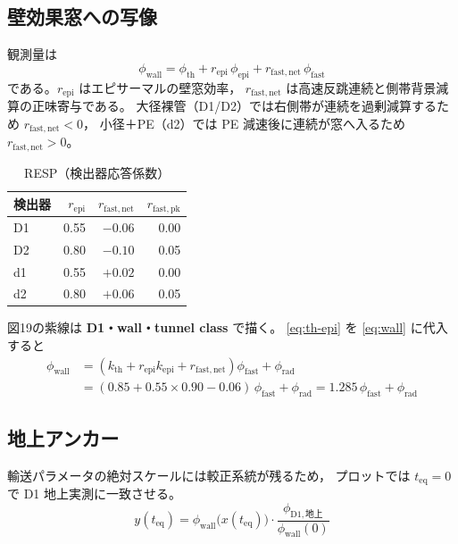 \documentclass[a4paper,11pt]{ltjsarticle}
\begin{document}
\subsection{壁効果窓への写像}

観測量は\cite{S3}
\begin{equation}
  \phi_{\mathrm{wall}}
  = \phi_{\mathrm{th}}
    + r_{\mathrm{epi}}\,\phi_{\mathrm{epi}}
    + r_{\mathrm{fast,net}}\,\phi_{\mathrm{fast}}
  \label{eq:wall}
\end{equation}
である。$r_{\mathrm{epi}}$ はエピサーマルの壁窓効率，
$r_{\mathrm{fast,net}}$ は高速反跳連続と側帯背景減算の正味寄与である。
大径裸管（D1/D2）では右側帯が連続を過剰減算するため $r_{\mathrm{fast,net}}<0$，
小径＋PE（d2）では PE 減速後に連続が窓へ入るため $r_{\mathrm{fast,net}}>0$\cite{Knoll,S3}。

\begin{table}[htbp]
  \centering
  \caption{RESP（検出器応答係数）\cite{S3}}
  \begin{tabular}{lrrr}
    \toprule
    検出器 & $r_{\mathrm{epi}}$ & $r_{\mathrm{fast,net}}$ & $r_{\mathrm{fast,pk}}$ \\
    \midrule
    D1 & 0.55 & $-0.06$ & 0.00 \\
    D2 & 0.80 & $-0.10$ & 0.05 \\
    d1 & 0.55 & $+0.02$ & 0.00 \\
    d2 & 0.80 & $+0.06$ & 0.05 \\
    \bottomrule
  \end{tabular}
\end{table}

図19の紫線は \textbf{D1・wall・tunnel class} で描く。
\eqref{eq:th-epi} を \eqref{eq:wall} に代入すると
\begin{align}
  \phi_{\mathrm{wall}}
  &= (k_{\mathrm{th}} + r_{\mathrm{epi}} k_{\mathrm{epi}} + r_{\mathrm{fast,net}})
     \phi_{\mathrm{fast}}
     + \phi_{\mathrm{rad}} \nonumber\\
  &= (0.85 + 0.55\times0.90 - 0.06)\,\phi_{\mathrm{fast}} + \phi_{\mathrm{rad}}
   = 1.285\,\phi_{\mathrm{fast}} + \phi_{\mathrm{rad}}
  \label{eq:wall-closed}
\end{align}

\subsection{地上アンカー}

輸送パラメータの絶対スケールには較正系統が残るため，
プロットでは $t_{\mathrm{eq}}=0$ で D1 地上実測に一致させる\cite{plotfig}。
\begin{equation}
  y(t_{\mathrm{eq}})
  = \phi_{\mathrm{wall}}\bigl(x(t_{\mathrm{eq}})\bigr)
    \cdot
    \frac{\phi_{\mathrm{D1,地上}}}{\phi_{\mathrm{wall}}(0)}
  \label{eq:anchor}
\end{equation}
\end{document}
